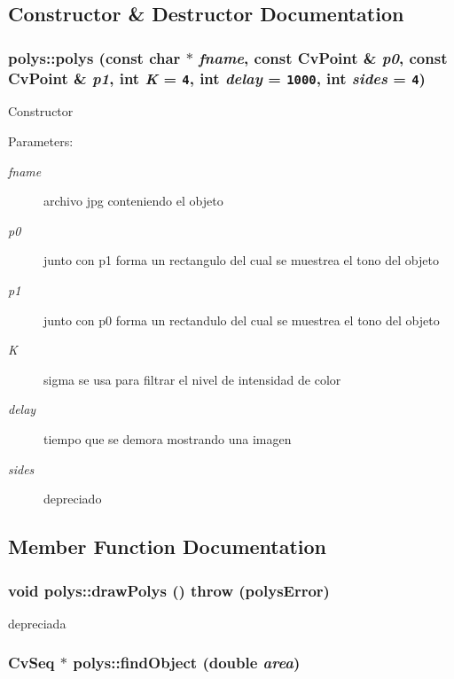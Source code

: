\subsection{Constructor \& Destructor Documentation}
\hypertarget{classpolys_5bca1e7b11049a71f581d8a42121cddb}{
\subsubsection[{polys}]{\setlength{\rightskip}{0pt plus 5cm}polys::polys (const char $\ast$ {\em fname}, \/  const CvPoint \& {\em p0}, \/  const CvPoint \& {\em p1}, \/  int {\em K} = {\tt 4}, \/  int {\em delay} = {\tt 1000}, \/  int {\em sides} = {\tt 4})}}
\label{classpolys_5bca1e7b11049a71f581d8a42121cddb}


Constructor

\begin{Desc}
\item[Parameters:]
\begin{description}
\item[{\em fname}]archivo jpg conteniendo el objeto \item[{\em p0}]junto con p1 forma un rectangulo del cual se muestrea el tono del objeto \item[{\em p1}]junto con p0 forma un rectandulo del cual se muestrea el tono del objeto \item[{\em K}]sigma se usa para filtrar el nivel de intensidad de color \item[{\em delay}]tiempo que se demora mostrando una imagen \item[{\em sides}]depreciado \end{description}
\end{Desc}


\subsection{Member Function Documentation}
\hypertarget{classpolys_ee69339d22923e16be105533518c8c01}{
\subsubsection[{drawPolys}]{\setlength{\rightskip}{0pt plus 5cm}void polys::drawPolys ()  throw (polysError)}}
\label{classpolys_ee69339d22923e16be105533518c8c01}


depreciada \hypertarget{classpolys_150df3ed5aaef122960c7050c6ceea11}{
\subsubsection[{findObject}]{\setlength{\rightskip}{0pt plus 5cm}CvSeq $\ast$ polys::findObject (double {\em area})}}
\label{classpolys_150df3ed5aaef122960c7050c6ceea11}


